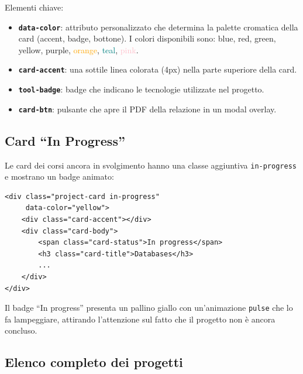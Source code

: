 \documentclass[a4paper,12pt]{report}
\begin{document}
Elementi chiave:
\begin{itemize}[leftmargin=2cm]
    \item \textbf{\texttt{data-color}}: attributo personalizzato che determina la palette cromatica della card (accent, badge, bottone). I colori disponibili sono: \textcolor{googleblue}{blue}, \textcolor{googlered}{red}, \textcolor{googlegreen}{green}, \textcolor{googleyellow}{yellow}, \textcolor{googlepurple}{purple}, \textcolor{orange}{orange}, \textcolor{teal}{teal}, \textcolor{pink}{pink}.
    \item \textbf{\texttt{card-accent}}: una sottile linea colorata (4px) nella parte superiore della card.
    \item \textbf{\texttt{tool-badge}}: badge che indicano le tecnologie utilizzate nel progetto.
    \item \textbf{\texttt{card-btn}}: pulsante che apre il PDF della relazione in un modal overlay.
\end{itemize}

\subsection{Card ``In Progress''}

Le card dei corsi ancora in svolgimento hanno una classe aggiuntiva \texttt{in-progress} e mostrano un badge animato:

\begin{lstlisting}[style=htmlstyle, caption={Card in progress}]
<div class="project-card in-progress"
     data-color="yellow">
    <div class="card-accent"></div>
    <div class="card-body">
        <span class="card-status">In progress</span>
        <h3 class="card-title">Databases</h3>
        ...
    </div>
</div>
\end{lstlisting}

Il badge ``In progress'' presenta un pallino giallo con un'animazione \texttt{pulse} che lo fa lampeggiare, attirando l'attenzione sul fatto che il progetto non \`e ancora concluso.

\subsection{Elenco completo dei progetti}
\end{document}
